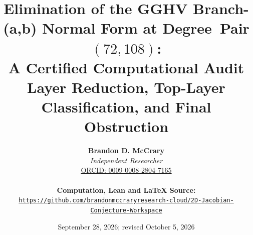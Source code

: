\documentclass[a4paper,11pt]{article}
\theoremstyle{plain}
\theoremstyle{definition}
\theoremstyle{remark}
\begin{document}
\title{\textbf{\Large Elimination of the GGHV Branch-(a,b) Normal Form at Degree~Pair $(72,108)$:}\\[0.6em]
\large A Certified Computational Audit\\[0.4em]
\normalsize Layer Reduction, Top-Layer Classification, and Final Obstruction}
\author{\textbf{Brandon D. McCrary}\\[0.25em]
\textit{Independent Researcher}\\[0.25em]
\href{https://orcid.org/0009-0008-2804-7165}{ORCID: 0009-0008-2804-7165}\\[0.6em]
{\small \parbox{0.92\textwidth}{\centering \textbf{Computation, Lean and LaTeX Source:}\\
{\color{neonmagenta}\hypersetup{urlcolor=neonmagenta}\href{https://github.com/brandonmccraryresearch-cloud/2D-Jacobian-Conjecture-Workspace}{\nolinkurl{https://github.com/brandonmccraryresearch-cloud/2D-Jacobian-Conjecture-Workspace}}}}}}
\date{September 28, 2026; revised October 5, 2026}
\maketitle
\end{document}
